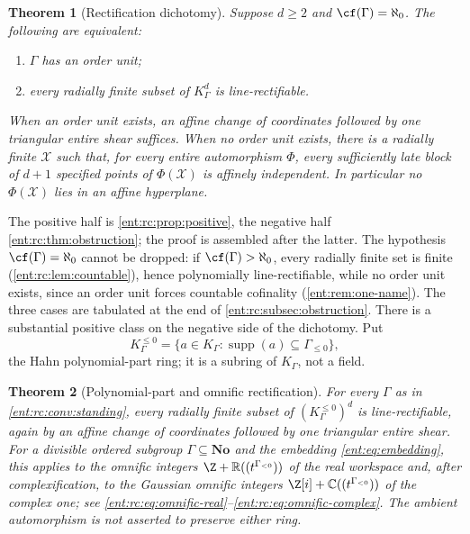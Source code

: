 \documentclass[11pt]{article}
\newtheorem{theorem}{Theorem}[section]
\theoremstyle{plain}
\theoremstyle{plain}
\theoremstyle{plain}
\theoremstyle{definition}
\theoremstyle{definition}
\theoremstyle{definition}
\theoremstyle{definition}
\theoremstyle{remark}
\newcommand{\C}{\mathbb C}\newcommand{\R}{\mathbb R}
\newcommand{\No}{\mathbf{No}}
\newcommand{\K}{K_\Gamma}\newcommand{\KD}{K_\Delta}
\DeclareMathOperator{\supp}{supp}\DeclareMathOperator{\lc}{lc}
\newcommand{\Kle}{K_\Gamma^{\le0}}\DeclareMathOperator{\Jac}{Jac}
\begin{document}
\begin{theorem}[Rectification dichotomy]\label{ent:rc:thm:main}
Suppose $d\ge2$ and $\cf(\Gamma)=\aleph_0$. The following are equivalent:
\begin{enumerate}[label=\textnormal{(\roman*)},leftmargin=2em]
\item $\Gamma$ has an order unit;
\item every radially finite subset of $\K^d$ is line-rectifiable.
\end{enumerate}
When an order unit exists, an affine change of coordinates followed by one
triangular entire shear suffices. When no order unit exists, there is a
radially finite $\mathcal X$ such that, for every entire automorphism $\Phi$,
every sufficiently late block of $d+1$ specified points of
$\Phi(\mathcal X)$ is affinely independent. In particular no
$\Phi(\mathcal X)$ lies in an affine hyperplane.
\end{theorem}

The positive half is \cref{ent:rc:prop:positive}, the negative half
\cref{ent:rc:thm:obstruction}; the proof is assembled after the latter. The
hypothesis $\cf(\Gamma)=\aleph_0$ cannot be dropped: if
$\cf(\Gamma)>\aleph_0$, every radially finite set is finite
(\cref{ent:rc:lem:countable}), hence polynomially line-rectifiable, while no
order unit exists, since an order unit forces countable cofinality
(\cref{ent:rem:one-name}). The three cases are tabulated at the end of
\cref{ent:rc:subsec:obstruction}. There is a substantial positive class on
the negative side of the dichotomy. Put
\begin{equation}\label{ent:rc:eq:Kle}
 \Kle=\{a\in\K:\supp(a)\subseteq\Gamma_{\le0}\},
\end{equation}
the Hahn polynomial-part ring; it is a subring of $\K$, not a field.

\begin{theorem}[Polynomial-part and omnific rectification]
\label{ent:rc:thm:omnific-main}
For every $\Gamma$ as in \cref{ent:rc:conv:standing}, every radially finite
subset of $(\Kle)^d$ is line-rectifiable, again by an affine change of
coordinates followed by one triangular entire shear. For a divisible ordered
subgroup $\Gamma\subseteq\No$ and the embedding \eqref{ent:eq:embedding},
this applies to the omnific integers
$\Z+\R((t^{\Gamma_{<0}}))$ of the real workspace and, after
complexification, to the Gaussian omnific integers
$\Z[i]+\C((t^{\Gamma_{<0}}))$ of the complex one; see
\eqref{ent:rc:eq:omnific-real}--\eqref{ent:rc:eq:omnific-complex}. The
ambient automorphism is not asserted to preserve either ring.
\end{theorem}
\end{document}
